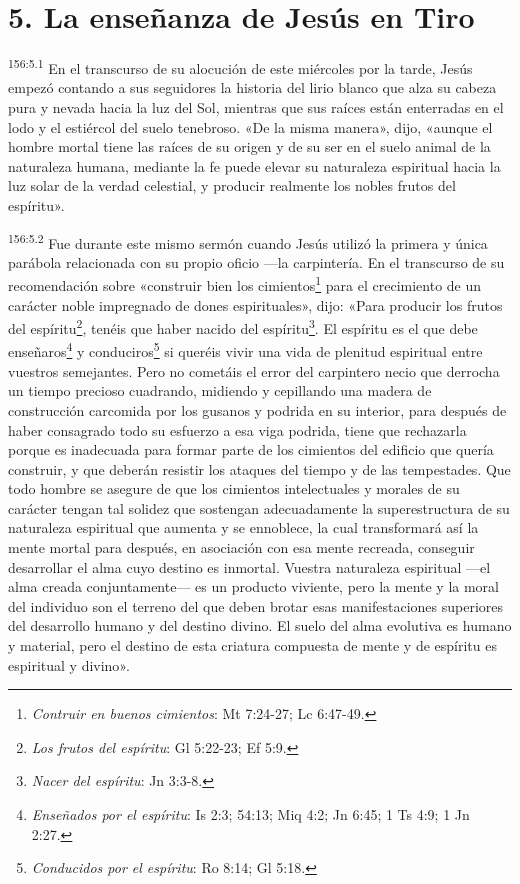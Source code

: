 \section*{5. La enseñanza de Jesús en Tiro}
\par
\textsuperscript{156:5.1} En el transcurso de su alocución de este miércoles por la tarde, Jesús empezó contando a sus seguidores la historia del lirio blanco que alza su cabeza pura y nevada hacia la luz del Sol, mientras que sus raíces están enterradas en el lodo y el estiércol del suelo tenebroso. «De la misma manera», dijo, «aunque el hombre mortal tiene las raíces de su origen y de su ser en el suelo animal de la naturaleza humana, mediante la fe puede elevar su naturaleza espiritual hacia la luz solar de la verdad celestial, y producir realmente los nobles frutos del espíritu».

\par
\textsuperscript{156:5.2} Fue durante este mismo sermón cuando Jesús utilizó la primera y única parábola relacionada con su propio oficio ---la carpintería. En el transcurso de su recomendación sobre «construir bien los cimientos\footnote{\textit{Contruir en buenos cimientos}: Mt 7:24-27; Lc 6:47-49.} para el crecimiento de un carácter noble impregnado de dones espirituales», dijo: «Para producir los frutos del espíritu\footnote{\textit{Los frutos del espíritu}: Gl 5:22-23; Ef 5:9.}, tenéis que haber nacido del espíritu\footnote{\textit{Nacer del espíritu}: Jn 3:3-8.}. El espíritu es el que debe enseñaros\footnote{\textit{Enseñados por el espíritu}: Is 2:3; 54:13; Miq 4:2; Jn 6:45; 1 Ts 4:9; 1 Jn 2:27.} y conduciros\footnote{\textit{Conducidos por el espíritu}: Ro 8:14; Gl 5:18.} si queréis vivir una vida de plenitud espiritual entre vuestros semejantes. Pero no cometáis el error del carpintero necio que derrocha un tiempo precioso cuadrando, midiendo y cepillando una madera de construcción carcomida por los gusanos y podrida en su interior, para después de haber consagrado todo su esfuerzo a esa viga podrida, tiene que rechazarla porque es inadecuada para formar parte de los cimientos del edificio que quería construir, y que deberán resistir los ataques del tiempo y de las tempestades. Que todo hombre se asegure de que los cimientos intelectuales y morales de su carácter tengan tal solidez que sostengan adecuadamente la superestructura de su naturaleza espiritual que aumenta y se ennoblece, la cual transformará así la mente mortal para después, en asociación con esa mente recreada, conseguir desarrollar el alma cuyo destino es inmortal. Vuestra naturaleza espiritual ---el alma creada conjuntamente--- es un producto viviente, pero la mente y la moral del individuo son el terreno del que deben brotar esas manifestaciones superiores del desarrollo humano y del destino divino. El suelo del alma evolutiva es humano y material, pero el destino de esta criatura compuesta de mente y de espíritu es espiritual y divino».

